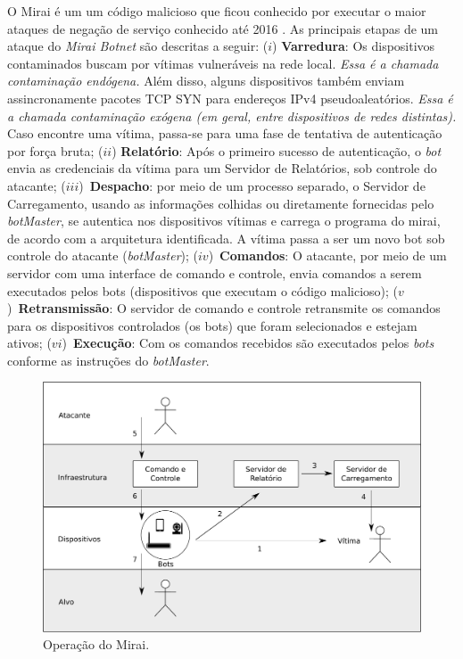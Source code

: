      O Mirai é um um código malicioso que ficou conhecido por executar o maior ataques de negação de serviço conhecido até 2016 \cite{krebs2016krebsonsecurity}. As principais etapas de um ataque do \textit{Mirai Botnet} são descritas a seguir:
    ($i$) \textbf{Varredura}: Os dispositivos contaminados buscam por vítimas vulneráveis na rede local.   \emph{Essa é a chamada contaminação  endógena.}  Além disso, alguns dispositivos também 
     enviam assincronamente pacotes TCP SYN para endereços IPv4 pseudoaleatórios.  \emph{Essa é a chamada contaminação exógena (em geral, entre dispositivos de redes distintas).}  
    Caso encontre uma vítima, passa-se para uma fase de tentativa de autenticação por força bruta; 
    ($ii$) \textbf{Relatório}: Após o primeiro sucesso de autenticação, o \textit{bot} envia as credenciais da vítima para um Servidor de Relatórios, sob controle do atacante; 
    ($iii$)~\textbf{Despacho}: por meio de um processo separado, o Servidor de Carregamento, usando as informações colhidas ou diretamente fornecidas pelo \textit{botMaster}, se autentica nos dispositivos vítimas e carrega o programa do mirai, de acordo com a arquitetura identificada. A vítima passa a ser um novo bot sob controle do atacante (\textit{botMaster}); 
    ($iv$)~\textbf{Comandos}: O atacante, por meio de um servidor com uma interface de comando e controle, envia comandos a serem executados pelos bots (dispositivos que executam o código malicioso); 
    ($v$)~\textbf{Retransmissão}: O servidor de comando e controle retransmite os comandos para os dispositivos controlados (os bots) que foram selecionados e estejam ativos; 
    ($vi$)~\textbf{Execução}: Com os comandos recebidos são executados pelos \textit{bots} conforme as instruções do \textit{botMaster}.
      
    
        \begin{figure}
            \centering
            \includegraphics[width=0.7\columnwidth]{img/mirai_structure.pdf}
            \caption{Operação do Mirai.} 
            \label{fig:mirai_structure}
        \end{figure}

